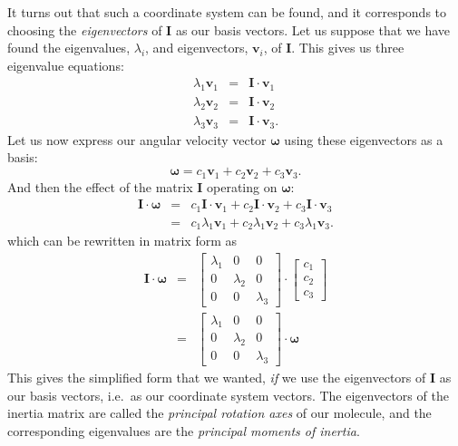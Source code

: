 \documentclass[a4paper]{article}
\newcommand{\bvec}[1]{\boldsymbol{\mathbf{#1}}}
\begin{document}
It turns out that such a coordinate system can be found, and it corresponds to choosing the \emph{eigenvectors} of $\bvec{I}$ as our basis vectors. Let us suppose that we have found the eigenvalues, $\lambda_i$, and eigenvectors, $\bvec{v}_i$, of $\bvec{I}$. This gives us three eigenvalue equations:
\begin{eqnarray*}
\lambda_1 \bvec{v}_1 & = & \bvec{I}\cdot\bvec{v}_1 \\
\lambda_2 \bvec{v}_2 & = & \bvec{I}\cdot\bvec{v}_2 \\
\lambda_3 \bvec{v}_3 & = & \bvec{I}\cdot\bvec{v}_3.
\end{eqnarray*}
Let us now express our angular velocity vector $\bvec{\omega}$ using these eigenvectors as a basis:
\begin{equation*}
\bvec{\omega} = c_1\bvec{v}_1 + c_2\bvec{v}_2 + c_3\bvec{v}_3.
\end{equation*} 
And then the effect of the matrix $\bvec{I}$ operating on $\bvec{\omega}$:
\begin{eqnarray*}
\bvec{I}\cdot\bvec{\omega} & = & c_1\bvec{I}\cdot\bvec{v}_1 + c_2\bvec{I}\cdot\bvec{v}_2 + c_3\bvec{I}\cdot\bvec{v}_3 \\
& = & c_1\lambda_1\bvec{v}_1 + c_2\lambda_1\bvec{v}_2 + c_3\lambda_1\bvec{v}_3.
\end{eqnarray*}
which can be rewritten in matrix form as
\begin{eqnarray*}
\bvec{I}\cdot\bvec{\omega} & = & 
\begin{bmatrix} 
\lambda_1 & 0 & 0 \\
0 & \lambda_2 & 0 \\
0 & 0 & \lambda_3
\end{bmatrix}
\cdot
\begin{bmatrix}c_1\\c_2\\c_3\end{bmatrix} \\
& = & \begin{bmatrix} 
\lambda_1 & 0 & 0 \\
0 & \lambda_2 & 0 \\
0 & 0 & \lambda_3
\end{bmatrix}
\cdot
\bvec{\omega}
\end{eqnarray*}
This gives the simplified form that we wanted, \emph{if} we use the eigenvectors of $\bvec{I}$ as our basis vectors, i.e.\ as our coordinate system vectors. The eigenvectors of the inertia matrix are called the \emph{principal rotation axes} of our molecule, and the corresponding eigenvalues are the \emph{principal moments of inertia}.
\end{document}
